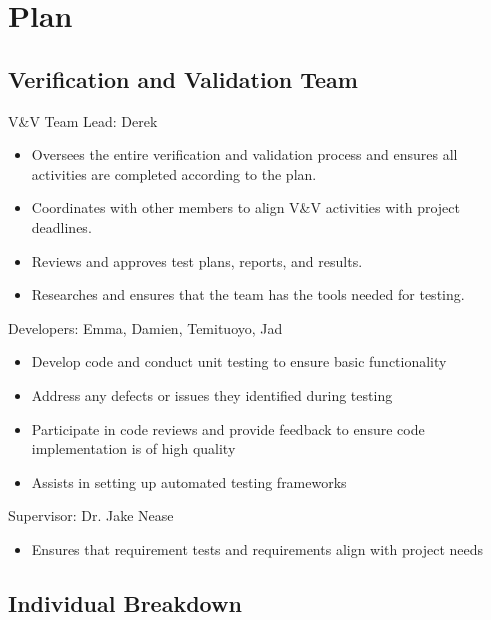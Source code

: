 \documentclass[12pt, titlepage]{article}
\begin{document}
\section{Plan}

\subsection{Verification and Validation Team}

V\&V Team Lead: Derek
\begin{itemize}
    \item Oversees the entire verification and validation process and ensures all activities are completed according to the plan.
    \item Coordinates with other members to align V\&V activities with project deadlines.
    \item Reviews and approves test plans, reports, and results.
    \item Researches and ensures that the team has the tools needed for testing.
\end{itemize}

\noindent Developers: Emma, Damien, Temituoyo, Jad
\begin{itemize}
    \item Develop code and conduct unit testing to ensure basic functionality
    \item Address any defects or issues they identified during testing
    \item Participate in code reviews and provide feedback to ensure code implementation is of high quality
    \item Assists in setting up automated testing frameworks
\end{itemize}

\noindent Supervisor: Dr. Jake Nease
\begin{itemize}
    \item Ensures that requirement tests and requirements align with project needs
\end{itemize}

\subsection*{Individual Breakdown}
\end{document}
